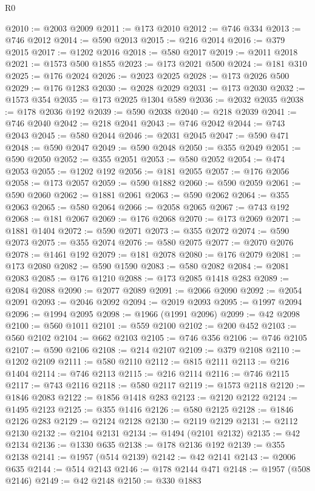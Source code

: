 \begin{lexlean}{R0}
\begin{coremodule}
@2010 := @2003 @2009
@2011 := @173 @2010
@2012 := @746 @334
@2013 := @746 @2012
@2014 := @590 @2013
@2015 := @216 @2014
@2016 := @379 @2015
@2017 := @1202 @2016
@2018 := @580 @2017
@2019 := @2011 @2018
@2021 := @1573 @500 @1855
@2023 := @173 @2021 @500
@2024 := @181 @310
@2025 := @176 @2024
@2026 := @2023 @2025
@2028 := @173 @2026 @500
@2029 := @176 @1283
@2030 := @2028 @2029
@2031 := @173 @2030
@2032 := @1573 @354
@2035 := @173 @2025 @1304 @589
@2036 := @2032 @2035
@2038 := @178 @2036 @192
@2039 := @590 @2038
@2040 := @218 @2039
@2041 := @746 @2040
@2042 := @218 @2041
@2043 := @746 @2042
@2044 := @743 @2043
@2045 := @580 @2044
@2046 := @2031 @2045
@2047 := @590 @471
@2048 := @590 @2047
@2049 := @590 @2048
@2050 := @355 @2049
@2051 := @590 @2050
@2052 := @355 @2051
@2053 := @580 @2052
@2054 := @474 @2053
@2055 := @1202 @192
@2056 := @181 @2055
@2057 := @176 @2056
@2058 := @173 @2057
@2059 := @590 @1882
@2060 := @590 @2059
@2061 := @590 @2060
@2062 := @1881 @2061
@2063 := @590 @2062
@2064 := @355 @2063
@2065 := @580 @2064
@2066 := @2058 @2065
@2067 := @743 @192
@2068 := @181 @2067
@2069 := @176 @2068
@2070 := @173 @2069
@2071 := @1881 @1404
@2072 := @590 @2071
@2073 := @355 @2072
@2074 := @590 @2073
@2075 := @355 @2074
@2076 := @580 @2075
@2077 := @2070 @2076
@2078 := @1461 @192
@2079 := @181 @2078
@2080 := @176 @2079
@2081 := @173 @2080
@2082 := @590 @1590
@2083 := @580 @2082
@2084 := @2081 @2083
@2085 := @176 @1210
@2088 := @173 @2085 @1418 @283
@2089 := @2084 @2088
@2090 := @2077 @2089
@2091 := @2066 @2090
@2092 := @2054 @2091
@2093 := @2046 @2092
@2094 := @2019 @2093
@2095 := @1997 @2094
@2096 := @1994 @2095
@2098 := @1966 (@1991 @2096)
@2099 := @42 @2098
@2100 := @560 @1011
@2101 := @559 @2100
@2102 := @200 @452
@2103 := @560 @2102
@2104 := @662 @2103
@2105 := @746 @356
@2106 := @746 @2105
@2107 := @590 @2106
@2108 := @214 @2107
@2109 := @379 @2108
@2110 := @1202 @2109
@2111 := @580 @2110
@2112 := @815 @2111
@2113 := @216 @1404
@2114 := @746 @2113
@2115 := @216 @2114
@2116 := @746 @2115
@2117 := @743 @2116
@2118 := @580 @2117
@2119 := @1573 @2118
@2120 := @1846 @2083
@2122 := @1856 @1418 @283
@2123 := @2120 @2122
@2124 := @1495 @2123
@2125 := @355 @1416
@2126 := @580 @2125
@2128 := @1846 @2126 @283
@2129 := @2124 @2128
@2130 := @2119 @2129
@2131 := @2112 @2130
@2132 := @2104 @2131
@2134 := @1494 (@2101 @2132)
@2135 := @42 @2134
@2136 := @1330 @635
@2138 := @178 @2136 @192
@2139 := @355 @2138
@2141 := @1957 (@514 @2139)
@2142 := @42 @2141
@2143 := @2006 @635
@2144 := @514 @2143
@2146 := @178 @2144 @471
@2148 := @1957 (@508 @2146)
@2149 := @42 @2148
@2150 := @330 @1883

\end{coremodule}
\end{lexlean}
